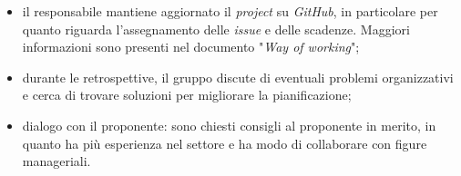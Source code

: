 \begin{itemize}
\begin{itemize}
		      \item il responsabile mantiene aggiornato il \textit{project} su
		            \textit{GitHub}, in particolare per quanto riguarda
		            l'assegnamento delle \textit{issue} e delle scadenze.
		            Maggiori informazioni sono presenti nel documento
		            "\textit{Way of working}";

		      \item durante le retrospettive, il gruppo discute di eventuali
		            problemi organizzativi e cerca di trovare soluzioni per
		            migliorare la pianificazione;

		      \item dialogo con il proponente: sono chiesti consigli al
		            proponente in merito, in quanto ha più esperienza
		            nel settore e ha modo di collaborare con figure manageriali.
	      \end{itemize}
\end{itemize}
